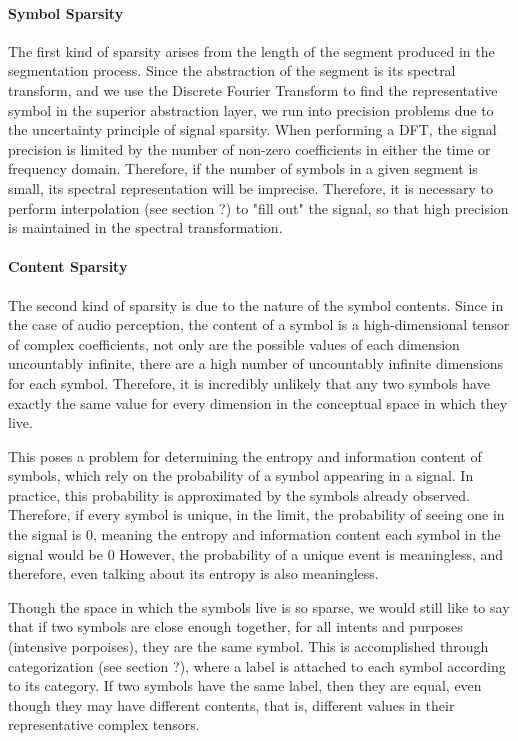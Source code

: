\documentclass[runningheads]{llncs}
\begin{document}
\paragraph{Symbol Sparsity}
The first kind of sparsity arises from the length of the segment produced in the segmentation process.  Since the abstraction of the segment is its spectral transform, and we use the Discrete Fourier Transform to find the representative symbol in the superior abstraction layer, we run into precision problems due to the uncertainty principle of signal sparsity.  When performing a DFT, the signal precision is limited by the number of non-zero coefficients in either the time or frequency domain.  Therefore, if the number of symbols in a given segment is small, its spectral representation will be imprecise.  Therefore, it is necessary to perform interpolation (see section ?) to "fill out" the signal, so that high precision is maintained in the spectral transformation.

\paragraph{Content Sparsity}
The second kind of sparsity is due to the nature of the symbol contents.  Since in the case of audio perception, the content of a symbol is a high-dimensional tensor of complex coefficients, not only are the possible values of each dimension uncountably infinite, there are a high number of uncountably infinite dimensions for each symbol.  Therefore, it is incredibly unlikely that any two symbols have exactly the same value for every dimension in the conceptual space in which they live.  

This poses a problem for determining the entropy and information content of symbols, which rely on the probability of a symbol appearing in a signal.  In practice, this probability is approximated by the symbols already observed.  Therefore, if every symbol is unique, in the limit, the probability of seeing one in the signal is 0, meaning the entropy and information content each symbol in the signal would be 0 However, the probability of a unique event is meaningless, and therefore, even talking about its entropy is also meaningless.  

Though the space in which the symbols live is so sparse, we would still like to say that if two symbols are close enough together, for all intents and purposes (intensive porpoises), they are the same symbol.  This is accomplished through categorization (see section ?), where a label is attached to each symbol according to its category.  If two symbols have the same label, then they are equal, even though they may have different contents, that is, different values in their representative complex tensors.
\end{document}
